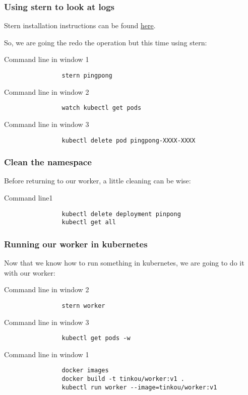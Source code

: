 	\begin{frame}[fragile]
		\frametitle{Using stern to look at logs}

		Stern installation instructions can be found \href{https://github.com/wercker/stern}{here}.
		
		\bigskip
		So, we are going the redo the operation but this time using stern:
		\begin{block}{Command line in window 1}
			\begin{verbatim}
				stern pingpong
			\end{verbatim}
		\end{block}
				\begin{block}{Command line in window 2}
			\begin{verbatim}
				watch kubectl get pods
			\end{verbatim}
		\end{block}
		\begin{block}{Command line in window 3}
			\begin{verbatim}
				kubectl delete pod pingpong-XXXX-XXXX
			\end{verbatim}
		\end{block}
	\end{frame}
	
	\begin{frame}[fragile]
		\frametitle{Clean the namespace}
		
		Before returning to our worker, a little cleaning can be wise:
		\begin{block}{Command line1}
			\begin{verbatim}
				kubectl delete deployment pinpong
				kubectl get all
			\end{verbatim}
		\end{block}
	\end{frame}
	
	\begin{frame}[fragile]
		\frametitle{Running our worker in kubernetes}
		
		Now that we know how to run something in kubernetes, we are going to do it with our worker:
		\begin{block}{Command line in window 2}
			\begin{verbatim}
				stern worker
			\end{verbatim}
		\end{block}		
		\begin{block}{Command line in window 3}
			\begin{verbatim}
				kubectl get pods -w
			\end{verbatim}
		\end{block}
		\begin{block}{Command line in window 1}
			\begin{verbatim}
				docker images
				docker build -t tinkou/worker:v1 .
				kubectl run worker --image=tinkou/worker:v1
			\end{verbatim}
		\end{block}
	\end{frame}
	
